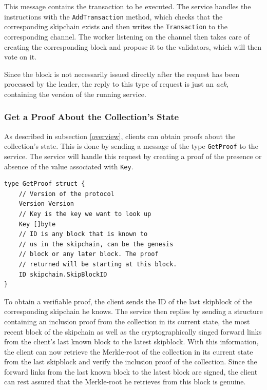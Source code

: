 \documentclass[11pt, a4paper, twoside, openright]{article} %
\begin{document}
This message contains the transaction to be executed.
The service handles the instructions with the
\texttt{AddTransaction} method, which checks that the corresponding skipchain
exists and then writes the \texttt{Transaction} to the corresponding channel.
The worker listening on the channel then takes care of creating the
corresponding block and propose it to the validators, which will then vote on
it.

Since the block is not necessarily issued directly after the request has been
processed by the leader, the reply to this type of request is just an
\textit{ack}, containing the version of the running service.



\subsubsection{Get a Proof About the Collection's State}

As described in subsection \ref{overview}, clients can obtain proofs about the
collection's state. This is done by sending a message of the type
\texttt{GetProof} to the service. The service will handle this request by
creating a proof of the presence or absence of the value associated with
\texttt{Key}. 

\begin{lstlisting}[caption={The structure of a \texttt{GetProof} message.},captionpos=b]
type GetProof struct {
	// Version of the protocol
	Version Version
	// Key is the key we want to look up
	Key []byte
	// ID is any block that is known to
    // us in the skipchain, can be the genesis
	// block or any later block. The proof
    // returned will be starting at this block.
	ID skipchain.SkipBlockID
}
\end{lstlisting}

To obtain a verifiable proof, the client sends the ID of the last skipblock of
the corresponding skipchain he knows. The service then replies by sending
a structure containing an inclusion  proof from the collection in its current
state, the most recent block of the skipchain as well as the cryptographically
singed forward links from the client's last known block to the latest
skipblock. With this information, the client can now retrieve the Merkle-root
of the collection in its current state from the last skipblock and verify the
inclusion proof of the collection. Since the forward links from the last known
block to the latest block are signed, the client can rest assured that the
Merkle-root he retrieves from this block is genuine.
\end{document}
